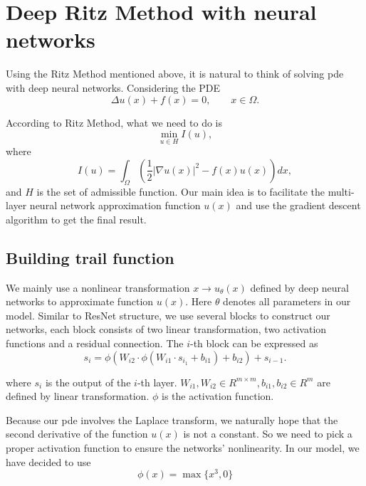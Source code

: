 \documentclass{article}
\begin{document}
\section{Deep Ritz Method with neural networks}
\par Using the Ritz Method mentioned above, it is natural to think of solving pde with deep neural networks. Considering the PDE
\begin{equation}
\Delta u(x)+f(x)=0,\qquad x\in \Omega.
\end {equation}
\par According to Ritz Method, what we need to do is
\begin{equation}
\min\limits_{u\in H}{I(u)},
\end{equation}
where
\begin{equation}\label{I_equ}
I(u)=\int_\Omega\left(\frac{1}{2}|\nabla u(x)|^2-f(x)u(x)\right)dx,
\end{equation}
and $H$ is the set of admissible function. Our main idea is to facilitate the multi-layer neural network approximation function $u(x)$ and use the gradient descent algorithm to get the final result.\\

\subsection{Building trail function}
\par We mainly use a nonlinear transformation $x \to u_{\theta}(x)$ defined by deep neural networks to approximate function $u(x)$. Here $\theta$ denotes all parameters in our model. Similar to ResNet structure, we use several blocks to construct our networks, each block consists of two linear transformation, two activation functions and a residual connection. The $i$-th block can be expressed as 
\begin{equation}
s_i=\phi(W_{i2}\cdot\phi(W_{i1}\cdot s_{i_1}+b_{i1})+b_{i2})+s_{i-1}.\label{res_equ}
\end{equation}

where $s_{i}$ is the output of the $i$-th layer. $W_{i1},W_{i2}\in R^{m\times m},b_{i1},b_{i2}\in R^{m}$ are defined by linear transformation. $\phi$ is the activation function.



\par Because our pde involves the Laplace transform, we naturally hope that the second derivative of the function $u(x)$ is not a constant. So we need to pick a proper activation function to ensure the networks' nonlinearity. In our model, we have decided to use 
\begin{equation}
\phi(x)=\max\{x^3,0\} 
\end{equation}
\end{document}
